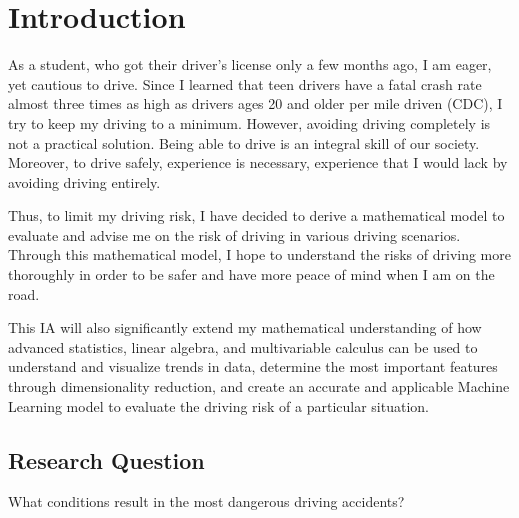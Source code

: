 \documentclass[11pt]{article}
\begin{document}


\section{Introduction}
\label{section:introduction}
As a student, who got their driver's license only a few months ago, I am eager, yet cautious to drive. Since I learned that teen drivers have a fatal crash rate almost three times as high as drivers ages 20 and older per mile driven (CDC), I try to keep my driving to a minimum. However, avoiding driving completely is not a practical solution. Being able to drive is an integral skill of our society. Moreover, to drive safely, experience is necessary, experience that I would lack by avoiding driving entirely.

Thus, to limit my driving risk, I have decided to derive a mathematical model to evaluate and advise me on the risk of driving in various driving scenarios. Through this mathematical model, I hope to understand the risks of driving more thoroughly in order to be safer and have more peace of mind when I am on the road. 

This IA will also significantly extend my mathematical understanding of how advanced statistics, linear algebra, and multivariable calculus can be used to understand and visualize trends in data, determine the most important features through dimensionality reduction, and create an accurate and applicable Machine Learning model to evaluate the driving risk of a particular situation.


\subsection{Research Question}
What conditions result in the most dangerous driving accidents?











\newpage



\newpage

\end{document}
